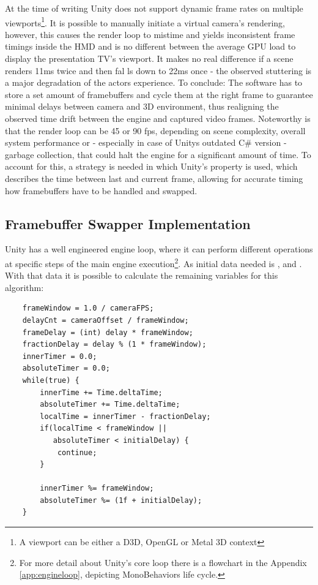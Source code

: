 At the time of writing Unity does not support dynamic frame rates on multiple 
viewports\footnote{A viewport can be either a D3D, OpenGL or Metal 3D context}.
\newline
It is possible to manually initiate a virtual camera's rendering, however, this 
causes the render loop to mistime and yields inconsistent frame timings inside 
the HMD and is no different between the average GPU load to display the 
presentation TV's viewport. It makes no real difference 
if a scene renders 11ms twice and then fal ls down to 22ms once - the observed 
stuttering is a major degradation of the actors experience.
\newline
To conclude: The software has to store a set amount of \gls{framebuffer}s and 
cycle them at the right frame to guarantee minimal delays between camera and 3D 
environment, thus realigning the observed time drift between the engine and 
captured video frames.
\newline
Noteworthy is that the render loop can be 45 or 90 fps, depending on scene 
complexity, overall system performance or - especially in case of Unitys 
outdated C\# version - garbage collection, that could halt the engine for a 
significant amount of time. To account for this, a strategy is needed in which 
Unity's  property is used, which describes the time 
between last and current frame, allowing for accurate timing how framebuffers 
have to be handled and swapped.

\subsection{Framebuffer Swapper Implementation}

Unity has a well engineered engine loop, where it can perform different 
operations at specific steps of the main engine execution\footnote{For more 
detail about Unity's core loop there is a flowchart in the Appendix 
\ref{app:engineloop}, depicting MonoBehaviors life cycle.}. As 
initial data needed is ,  and 
. With that data it is possible to calculate the remaining 
variables for this algorithm:

\begin{lstlisting}
	frameWindow = 1.0 / cameraFPS;
	delayCnt = cameraOffset / frameWindow;
	frameDelay = (int) delay * frameWindow;
	fractionDelay = delay % (1 * frameWindow);
	innerTimer = 0.0;
	absoluteTimer = 0.0;
	while(true) {
		innerTime += Time.deltaTime;
		absoluteTimer += Time.deltaTime;
		localTime = innerTimer - fractionDelay;
		if(localTime < frameWindow ||
		   absoluteTimer < initialDelay) {
			continue;
		}
		
		innerTimer %= frameWindow;
		absoluteTimer %= (1f + initialDelay);
	}
\end{lstlisting}

